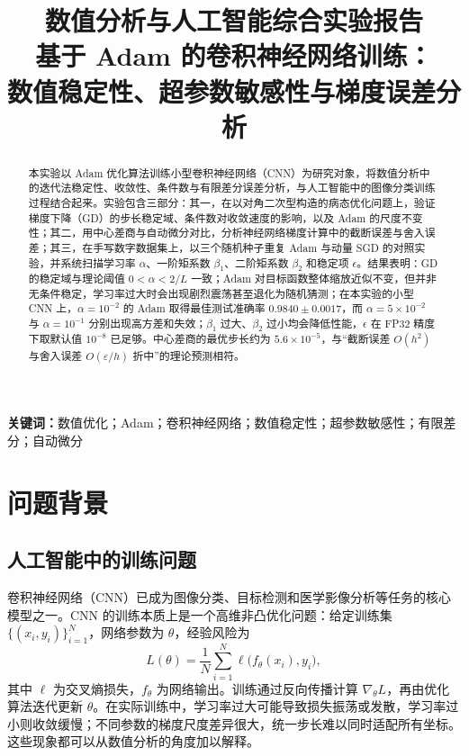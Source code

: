 \documentclass[12pt,a4paper]{ctexart}
\title{数值分析与人工智能综合实验报告\\[4pt]
{\Large 基于 Adam 的卷积神经网络训练：\\[2pt]
数值稳定性、超参数敏感性与梯度误差分析}}
\author{}
\date{}
\begin{document}
\maketitle

\begin{abstract}
本实验以 Adam 优化算法训练小型卷积神经网络（CNN）为研究对象，将数值分析中的迭代法稳定性、收敛性、条件数与有限差分误差分析，与人工智能中的图像分类训练过程结合起来。实验包含三部分：其一，在以对角二次型构造的病态优化问题上，验证梯度下降（GD）的步长稳定域、条件数对收敛速度的影响，以及 Adam 的尺度不变性；其二，用中心差商与自动微分对比，分析神经网络梯度计算中的截断误差与舍入误差；其三，在手写数字数据集上，以三个随机种子重复 Adam 与动量 SGD 的对照实验，并系统扫描学习率 $\alpha$、一阶矩系数 $\beta_1$、二阶矩系数 $\beta_2$ 和稳定项 $\epsilon$。结果表明：GD 的稳定域与理论阈值 $0<\alpha<2/L$ 一致；Adam 对目标函数整体缩放近似不变，但并非无条件稳定，学习率过大时会出现剧烈震荡甚至退化为随机猜测；在本实验的小型 CNN 上，$\alpha=10^{-2}$ 的 Adam 取得最佳测试准确率 $0.9840\pm0.0017$，而 $\alpha=5\times10^{-2}$ 与 $\alpha=10^{-1}$ 分别出现高方差和失效；$\beta_1$ 过大、$\beta_2$ 过小均会降低性能，$\epsilon$ 在 FP32 精度下取默认值 $10^{-8}$ 已足够。中心差商的最优步长约为 $5.6\times10^{-5}$，与“截断误差 $O(h^2)$ 与舍入误差 $O(\varepsilon/h)$ 折中”的理论预测相符。
\end{abstract}

\noindent\textbf{关键词：}数值优化；Adam；卷积神经网络；数值稳定性；超参数敏感性；有限差分；自动微分

\section{问题背景}

\subsection{人工智能中的训练问题}
卷积神经网络（CNN）已成为图像分类、目标检测和医学影像分析等任务的核心模型之一。CNN 的训练本质上是一个高维非凸优化问题：给定训练集 $\{(x_i,y_i)\}_{i=1}^N$，网络参数为 $\theta$，经验风险为
\begin{equation}
L(\theta)=\frac{1}{N}\sum_{i=1}^{N}\ell\bigl(f_\theta(x_i),y_i\bigr),
\end{equation}
其中 $\ell$ 为交叉熵损失，$f_\theta$ 为网络输出。训练通过反向传播计算 $\nabla_\theta L$，再由优化算法迭代更新 $\theta$。在实际训练中，学习率过大可能导致损失振荡或发散，学习率过小则收敛缓慢；不同参数的梯度尺度差异很大，统一步长难以同时适配所有坐标。这些现象都可以从数值分析的角度加以解释。
\end{document}
